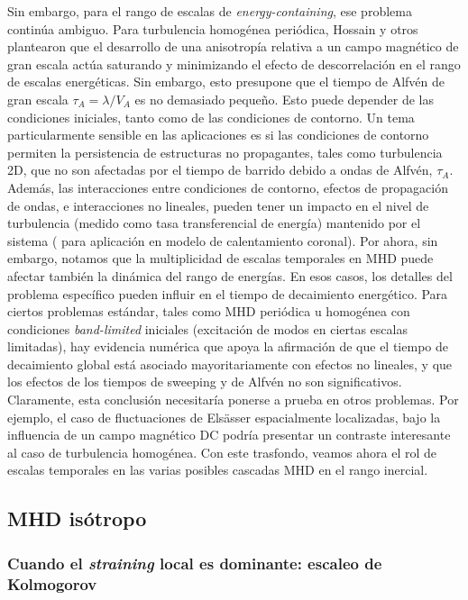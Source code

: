 Sin embargo, para el rango de escalas de \textit{energy-containing},
ese problema continúa ambiguo. Para turbulencia homogénea periódica,
Hossain y otros \cite{Hossain_solar_1996} plantearon que el desarrollo
de una anisotropía relativa a un campo magnético de gran escala actúa
saturando y minimizando el efecto de descorrelación en el rango de
escalas energéticas. Sin embargo, esto presupone que el tiempo de
Alfv\'en de gran escala $\tau_A = \lambda/V_A$ es no demasiado
pequeño. Esto puede depender de las condiciones iniciales, tanto como
de las condiciones de contorno. Un tema particularmente sensible en
las aplicaciones \cite{dmitruk_conditions_2001} es si las condiciones
de contorno permiten la persistencia de estructuras no propagantes,
tales como turbulencia 2D, que no son afectadas por el tiempo de
barrido debido a ondas de Alfv\'en, $\tau_A$. Además, las
interacciones entre condiciones de contorno, efectos de propagación de
ondas, e interacciones no lineales, pueden tener un impacto en el
nivel de turbulencia (medido como tasa transferencial de energía)
mantenido por el sistema (\cite{dmitruk_lowfrequency_2003} para
aplicación en modelo de calentamiento coronal). Por ahora, sin
embargo, notamos que la multiplicidad de escalas temporales en MHD
puede afectar también la dinámica del rango de energías. En esos
casos, los detalles del problema específico pueden influir en el
tiempo de decaimiento energético. Para ciertos problemas estándar,
tales como MHD periódica u homogénea con condiciones
\textit{band-limited} iniciales (excitación de modos en ciertas
escalas limitadas), hay evidencia numérica que apoya la afirmación de
que el tiempo de decaimiento global está asociado mayoritariamente con
efectos no lineales, y que los efectos de los tiempos de sweeping y de
Alfv\'en no son significativos. Claramente, esta conclusión
necesitaría ponerse a prueba en otros problemas. Por ejemplo, el caso
de fluctuaciones de Els\"asser espacialmente localizadas, bajo la
influencia de un campo magnético DC \cite{parker_cosmical_2019} podría
presentar un contraste interesante al caso de turbulencia
homogénea. Con este trasfondo, veamos ahora el rol de escalas
temporales en las varias posibles cascadas MHD en el rango inercial.


\subsection{MHD isótropo}
\subsubsection{Cuando el \textit{straining} local es dominante: escaleo de
  Kolmogorov}

